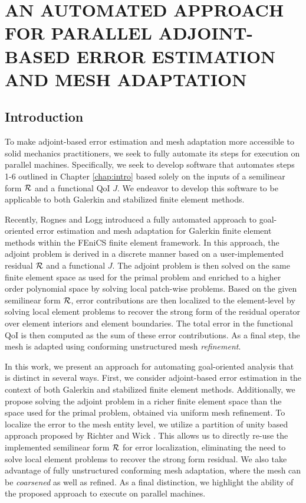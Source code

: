 \chapter{AN AUTOMATED APPROACH FOR PARALLEL ADJOINT-BASED
ERROR ESTIMATION AND MESH ADAPTATION}
\label{chap:automated}


\section{Introduction}

To make adjoint-based
error estimation and mesh adaptation more accessible to solid mechanics
practitioners, we seek to fully automate its steps for execution on
parallel machines. Specifically, we seek to
develop software that automates steps 1-6 outlined in Chapter \ref{chap:intro}
based solely on the
inputs of a semilinear form $\mathcal{R}$ and a functional QoI $J$. We endeavor to
develop this software to be applicable to both Galerkin and stabilized
finite element methods.

Recently, Rognes and Logg \cite{rognes2013automated} introduced a fully
automated approach to goal-oriented error estimation and mesh adaptation for
Galerkin finite element methods within the FEniCS \cite{logg2012automated}
finite element framework. In this approach, the adjoint problem is derived
in a discrete manner based on a user-implemented residual $\mathcal{R}$ and a
functional $J$. The adjoint problem is then solved on the same finite element
space as used for the primal problem and enriched to a higher order
polynomial space by solving local patch-wise problems.
Based on the given semilinear form
$\mathcal{R}$, error contributions are then localized to the element-level by solving
local element problems to recover the strong form of the residual operator
over element interiors and element boundaries. The total error in the
functional QoI is then computed as the sum of these error contributions. As a
final step, the mesh is adapted using conforming unstructured mesh
\emph{refinement}.

In this work, we present an approach for automating goal-oriented
analysis that is distinct in several ways. First, we consider adjoint-based
error estimation in the context of both Galerkin and stabilized finite element
methods. Additionally, we propose solving the adjoint problem in a richer
finite element space than the space used for the primal problem, obtained
via uniform mesh refinement. To localize the error to the mesh entity level,
we utilize a partition of unity based approach proposed by Richter
and Wick \cite{richter2015variational}. This allows us to directly re-use the
implemented semilinear form $\mathcal{R}$ for error localization, eliminating the need
to solve local element problems to recover the strong form residual. We also
take advantage of fully unstructured conforming mesh adaptation, where the
mesh can be \emph{coarsened} as well as refined. As a final distinction, we
highlight the ability of the proposed approach to execute on parallel machines.

